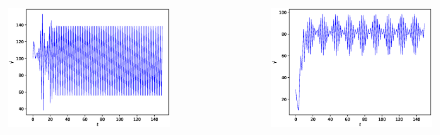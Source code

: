 \documentclass{beamer}
\begin{document}
\begin{frame}{}
	\begin{columns}
	\begin{column}{0.5\textwidth}
		\begin{figure}
			\centering
			\includegraphics[width=1.2\textwidth]{timeseries1.eps}
		\end{figure}
	\end{column}
	\begin{column}{0.5\textwidth}
		\begin{figure}
			\centering
			\includegraphics[width=1.2\textwidth]{timeseries3.eps}
		\end{figure}
	\end{column}
	\end{columns}
\end{frame}
\end{document}
